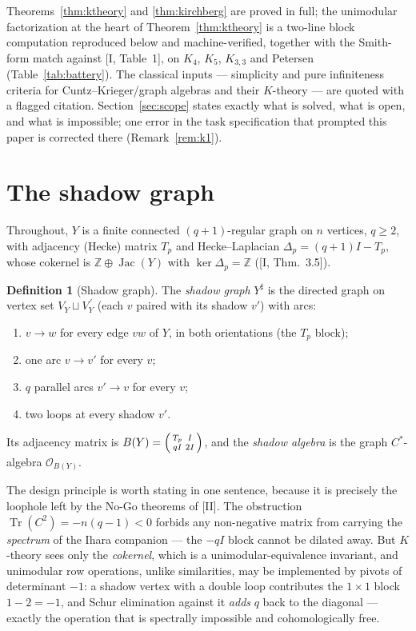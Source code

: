 \documentclass[11pt]{amsart}
\numberwithin{equation}{section}
\theoremstyle{definition}
\newtheorem{definition}[theorem]{Definition}
\theoremstyle{remark}
\newcommand{\Z}{\mathbb{Z}}
\newcommand{\cO}{\mathcal{O}}
\newcommand{\Jac}{\operatorname{Jac}}
\newcommand{\Tr}{\operatorname{Tr}}
\newcommand{\shadow}{Y^{\sharp}}
\begin{document}
Theorems~\ref{thm:ktheory} and \ref{thm:kirchberg} are proved in full;
the unimodular factorization at the heart of Theorem~\ref{thm:ktheory} is a two-line
block computation reproduced below and machine-verified, together with the Smith-form
match against [I, Table~1], on $K_4$, $K_5$, $K_{3,3}$ and Petersen
(Table~\ref{tab:battery}). The classical inputs --- simplicity and pure infiniteness
criteria for Cuntz--Krieger/graph algebras and their $K$-theory --- are quoted with a
flagged citation. Section~\ref{sec:scope} states exactly what is solved, what is
open, and what is impossible; one error in the task specification that prompted this
paper is corrected there (Remark~\ref{rem:k1}).

\section{The shadow graph}\label{sec:shadow}

Throughout, $Y$ is a finite connected $(q+1)$-regular graph on $n$ vertices, $q\ge2$,
with adjacency (Hecke) matrix $T_p$ and Hecke--Laplacian $\Delta_p=(q+1)I-T_p$, whose
cokernel is $\Z\oplus\Jac(Y)$ with $\ker\Delta_p=\Z$ ([I, Thm.~3.5]).

\begin{definition}[Shadow graph]\label{def:shadow}
The \emph{shadow graph} $\shadow$ is the directed graph on vertex set
$V_Y\sqcup V_Y^{\,\prime}$ (each $v$ paired with its shadow $v'$) with arcs:
\begin{enumerate}
\item[(i)] $v\to w$ for every edge $vw$ of $Y$, in both orientations (the $T_p$
block);
\item[(ii)] one arc $v\to v'$ for every $v$;
\item[(iii)] $q$ parallel arcs $v'\to v$ for every $v$;
\item[(iv)] two loops at every shadow $v'$.
\end{enumerate}
Its adjacency matrix is $B(Y)=\begin{psmallmatrix}T_p&I\\qI&2I\end{psmallmatrix}$,
and the \emph{shadow algebra} is the graph $C^*$-algebra $\cO_{B(Y)}$.
\end{definition}

The design principle is worth stating in one sentence, because it is precisely the
loophole left by the No-Go theorems of [II]. The obstruction
$\Tr(C^2)=-n(q-1)<0$ forbids any non-negative matrix from carrying the
\emph{spectrum} of the Ihara companion --- the $-qI$ block cannot be dilated away.
But $K$-theory sees only the \emph{cokernel}, which is a unimodular-equivalence
invariant, and unimodular row operations, unlike similarities, may be implemented by
pivots of determinant $-1$: a shadow vertex with a double loop contributes the
$1\times1$ block $1-2=-1$, and Schur elimination against it \emph{adds} $q$ back to
the diagonal --- exactly the operation that is spectrally impossible and
cohomologically free.
\end{document}
